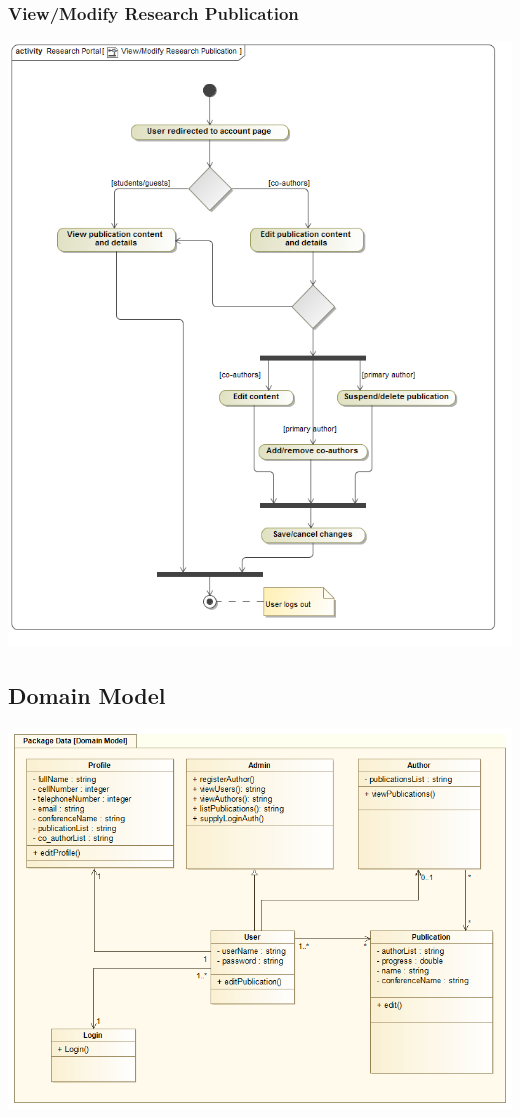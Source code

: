 \documentclass[hidelinks,a4paper,12pt]{article}
\begin{document}
		\subsubsection{View/Modify Research Publication}
		\includegraphics[width=1\textwidth]{./Graphs/ViewModifyResearchPublication.png}\\[0.4cm]
		
		
		\subsection{Domain Model}
		\includegraphics[width=1\textwidth]{./Graphs/DomainModel.png}\\[0.4cm]
	
\end{document}
